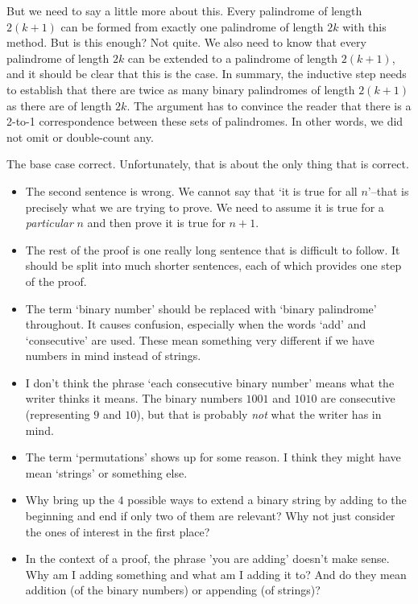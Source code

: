 \begin{eval}
\begin{answer}
\begin{pfevalenum}
\begin{itemize}
	But we need to say a little more about this.  Every palindrome of length
	$2(k+1)$ can be formed from exactly one palindrome of length $2k$ with this method.  But is this enough?  
	Not quite.  We also need to know that every palindrome of length $2k$ can be extended to a palindrome of
	length $2(k+1)$, and it should be clear that this is the case.  
	In summary, the inductive step needs to establish that there are twice as many binary palindromes of length $2(k+1)$ as there are of length $2k$.  
	The argument has to convince the reader that there is a 2-to-1 correspondence between these sets of palindromes.  In other words, we did not omit or double-count any.
	\end{itemize}
\item
	The base case correct.  Unfortunately, that is about the only thing that is correct.
	\begin{itemize}
	\item 
	The second sentence is wrong. 
	We cannot say that `it is true for all $n$'--that is precisely what we are trying to prove.  We need
	to assume it is true for a {\em particular} $n$ and then prove it is true for $n+1$.
	\item
	The rest of the proof is one really long sentence that is difficult to follow.  It should be split
	into much shorter sentences, each of which provides one step of the proof.	
	\item
	The term `binary number' should be replaced with `binary palindrome' throughout.  It causes
	confusion, especially when the words `add' and `consecutive' are used.  These mean something
	very different if we have numbers in mind instead of strings.
	\item  
	I don't think the phrase `each consecutive binary number' means what the writer thinks it means. 
	The binary numbers $1001$ and $1010$ are consecutive (representing $9$ and $10$), but that is 
	probably {\em not}	what the writer has in mind.
	\item
	The term `permutations' shows up for some reason.  
	I think they might have mean `strings' or something else.
	\item
	Why bring up the $4$ possible ways to extend a binary
	string by adding to the beginning and end if only two of them are relevant? 
	Why not just consider the ones of interest in the first place?
	\item
	In the context of a proof, the phrase 'you are adding' doesn't make sense.  Why am I adding something
	and what am I adding it to?  And do they mean addition (of the binary numbers) or appending (of strings)?

\end{itemize}
\end{pfevalenum}
\end{answer}
\end{eval}
